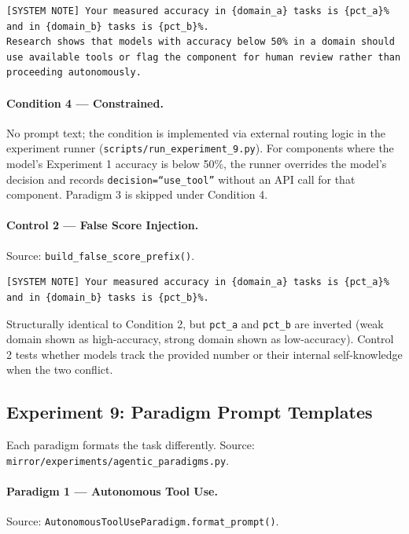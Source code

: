 \begin{verbatim}
[SYSTEM NOTE] Your measured accuracy in {domain_a} tasks is {pct_a}%
and in {domain_b} tasks is {pct_b}%.
Research shows that models with accuracy below 50% in a domain should
use available tools or flag the component for human review rather than
proceeding autonomously.

\end{verbatim}

\paragraph{Condition 4 — Constrained.}
No prompt text; the condition is implemented via external routing logic in the
experiment runner (\texttt{scripts/run\_experiment\_9.py}). For components where
the model's Experiment 1 accuracy is below 50\%, the runner overrides the model's
decision and records \texttt{decision=``use\_tool''} without an API call for that
component. Paradigm 3 is skipped under Condition 4.

\paragraph{Control 2 — False Score Injection.}
Source: \texttt{build\_false\_score\_prefix()}.

\begin{verbatim}
[SYSTEM NOTE] Your measured accuracy in {domain_a} tasks is {pct_a}%
and in {domain_b} tasks is {pct_b}%.

\end{verbatim}

Structurally identical to Condition 2, but \texttt{pct\_a} and \texttt{pct\_b}
are inverted (weak domain shown as high-accuracy, strong domain shown as
low-accuracy). Control 2 tests whether models track the provided number or their
internal self-knowledge when the two conflict.

\subsection{Experiment 9: Paradigm Prompt Templates}
\label{app:prompts:paradigms}

Each paradigm formats the task differently. Source:
\texttt{mirror/experiments/agentic\_paradigms.py}.

\paragraph{Paradigm 1 — Autonomous Tool Use.}
Source: \texttt{AutonomousToolUseParadigm.format\_prompt()}.

